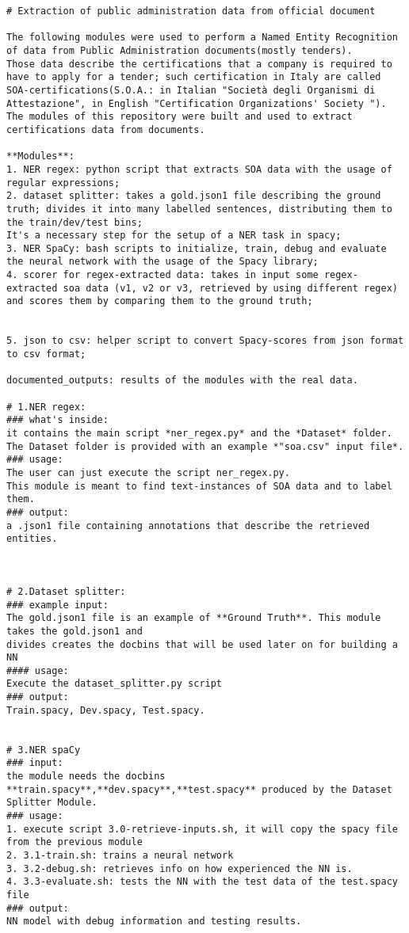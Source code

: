 \documentclass[12pt,leqno]{amsart}
\begin{document}
\lipsum[1]  %
\begin{Verbatim}
# Extraction of public administration data from official document

The following modules were used to perform a Named Entity Recognition of data from Public Administration documents(mostly tenders).
Those data describe the certifications that a company is required to have to apply for a tender; such certification in Italy are called SOA-certifications(S.O.A.: in Italian "Società degli Organismi di Attestazione", in English "Certification Organizations' Society ").
The modules of this repository were built and used to extract  certifications data from documents.

**Modules**: 
1. NER regex: python script that extracts SOA data with the usage of regular expressions;
2. dataset splitter: takes a gold.json1 file describing the ground truth; divides it into many labelled sentences, distributing them to the train/dev/test bins;
It's a necessary step for the setup of a NER task in spacy;
3. NER SpaCy: bash scripts to initialize, train, debug and evaluate the neural network with the usage of the Spacy library;
4. scorer for regex-extracted data: takes in input some regex-extracted soa data (v1, v2 or v3, retrieved by using different regex) and scores them by comparing them to the ground truth;


5. json to csv: helper script to convert Spacy-scores from json format to csv format;

documented_outputs: results of the modules with the real data.

# 1.NER regex:
### what's inside:
it contains the main script *ner_regex.py* and the *Dataset* folder.
The Dataset folder is provided with an example *"soa.csv" input file*.
### usage:
The user can just execute the script ner_regex.py.
This module is meant to find text-instances of SOA data and to label them.
### output:
a .json1 file containing annotations that describe the retrieved entities.



# 2.Dataset splitter:
### example input:
The gold.json1 file is an example of **Ground Truth**. This module takes the gold.json1 and
divides creates the docbins that will be used later on for building a NN
#### usage:
Execute the dataset_splitter.py script
### output:
Train.spacy, Dev.spacy, Test.spacy.


# 3.NER spaCy
### input:
the module needs the docbins **train.spacy**,**dev.spacy**,**test.spacy** produced by the Dataset Splitter Module.
### usage:
1. execute script 3.0-retrieve-inputs.sh, it will copy the spacy file from the previous module 
2. 3.1-train.sh: trains a neural network
3. 3.2-debug.sh: retrieves info on how experienced the NN is.
4. 3.3-evaluate.sh: tests the NN with the test data of the test.spacy file
### output:
NN model with debug information and testing results.


\end{Verbatim}
\end{document}
